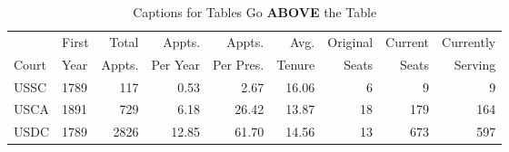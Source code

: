 \begin{table}[htbp]
\caption{Captions for Tables Go \textbf{ABOVE} the Table}
\label{tab:example1} %
\begin{center}
\begin{tabular}{llrrrrrrr}
\toprule
& First & Total & Appts. & Appts. & Avg. & Original & Current & Currently\\
Court & Year & Appts. & Per Year & Per Pres. & Tenure & Seats & Seats & Serving\\
\midrule
USSC & 1789 & 117 & 0.53 & 2.67 & 16.06 & 6 & 9 & 9 \\ 
USCA & 1891 & 729 & 6.18 & 26.42 & 13.87 & 18 & 179 & 164 \\ 
USDC & 1789 & 2826 & 12.85 & 61.70 & 14.56 & 13 & 673 & 597 \\ 
\bottomrule
\end{tabular}
\end{center}
\end{table} 